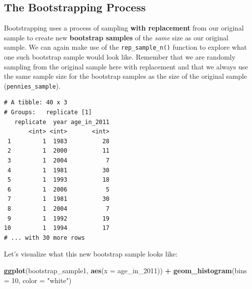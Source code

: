 \documentclass[12pt,]{krantz}
\makeatletter
\newenvironment{Shaded}{\begin{snugshade}}{\end{snugshade}}
\newcommand{\KeywordTok}[1]{\textcolor[rgb]{0.27,0.27,0.27}{\textbf{#1}}}
\newcommand{\DataTypeTok}[1]{\textcolor[rgb]{0.27,0.27,0.27}{#1}}
\newcommand{\DecValTok}[1]{\textcolor[rgb]{0.06,0.06,0.06}{#1}}
\newcommand{\StringTok}[1]{\textcolor[rgb]{0.5,0.5,0.5}{#1}}
\newcommand{\OtherTok}[1]{\textcolor[rgb]{0.37,0.37,0.37}{#1}}
\newcommand{\OperatorTok}[1]{\textcolor[rgb]{0.43,0.43,0.43}{\textbf{#1}}}
\newcommand{\NormalTok}[1]{#1}
\newenvironment{kframe}{%
\medskip{}
\setlength{\fboxsep}{.8em}
 \def\at@end@of@kframe{}%
 \ifinner\ifhmode%
  \def\at@end@of@kframe{\end{minipage}}%
  \begin{minipage}{\columnwidth}%
 \fi\fi%
 \def\FrameCommand##1{\hskip\@totalleftmargin \hskip-\fboxsep
 \colorbox{shadecolor}{##1}\hskip-\fboxsep
     \hskip-\linewidth \hskip-\@totalleftmargin \hskip\columnwidth}%
 \MakeFramed {\advance\hsize-\width
   \@totalleftmargin\z@ \linewidth\hsize
   \@setminipage}}%
 {\par\unskip\endMakeFramed%
 \at@end@of@kframe}
\renewenvironment{Shaded}{\begin{kframe}}{\end{kframe}}
\theoremstyle{definition}
\theoremstyle{definition}
\theoremstyle{definition}
\theoremstyle{remark}
\makeatother
\begin{document}
\subsection{The Bootstrapping Process}\label{bootstrap-process}

Bootstrapping uses a process of sampling \textbf{with replacement} from
our original sample to create new \textbf{bootstrap samples} of the
\emph{same} size as our original sample. We can again make use of the
\texttt{rep\_sample\_n()} function to explore what one such bootstrap
sample would look like. Remember that we are randomly sampling from the
original sample here with replacement and that we always use the same
sample size for the bootstrap samples as the size of the original sample
(\texttt{pennies\_sample}).

\begin{Shaded}
\end{Shaded}

\begin{verbatim}
# A tibble: 40 x 3
# Groups:   replicate [1]
   replicate  year age_in_2011
       <int> <int>       <int>
 1         1  1983          28
 2         1  2000          11
 3         1  2004           7
 4         1  1981          30
 5         1  1993          18
 6         1  2006           5
 7         1  1981          30
 8         1  2004           7
 9         1  1992          19
10         1  1994          17
# ... with 30 more rows
\end{verbatim}

Let's visualize what this new bootstrap sample looks like:

\begin{Shaded}
\begin{Highlighting}[]
\KeywordTok{ggplot}\NormalTok{(bootstrap_sample1, }\KeywordTok{aes}\NormalTok{(}\DataTypeTok{x =}\NormalTok{ age_in_}\DecValTok{2011}\NormalTok{)) }\OperatorTok{+}
\StringTok{  }\KeywordTok{geom_histogram}\NormalTok{(}\DataTypeTok{bins =} \DecValTok{10}\NormalTok{, }\DataTypeTok{color =} \StringTok{"white"}\NormalTok{)}
\end{Highlighting}
\end{Shaded}
\end{document}
